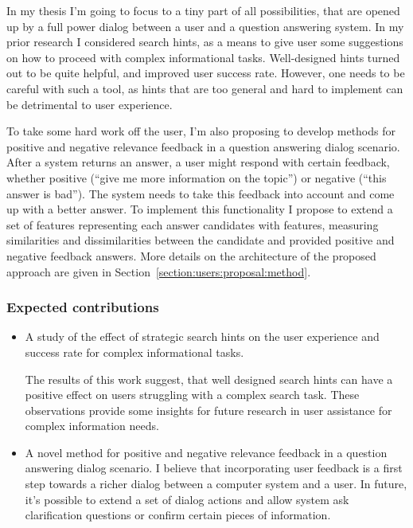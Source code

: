 In my thesis I'm going to focus to a tiny part of all possibilities, that are opened up by a full power dialog between a user and a question answering system.
In my prior research I considered search hints, as a means to give user some suggestions on how to proceed with complex informational tasks.
Well-designed hints turned out to be quite helpful, and improved user success rate.
However, one needs to be careful with such a tool, as hints that are too general and hard to implement can be detrimental to user experience.

To take some hard work off the user, I'm also proposing to develop methods for positive and negative relevance feedback in a question answering dialog scenario.
After a system returns an answer, a user might respond with certain feedback, whether positive (\eg ``give me more information on the topic'') or negative (\eg ``this answer is bad'').
The system needs to take this feedback into account and come up with a better answer.
To implement this functionality I propose to extend a set of features representing each answer candidates with features, measuring similarities and dissimilarities between the candidate and provided positive and negative feedback answers.
More details on the architecture of the proposed approach are given in Section~\ref{section:users:proposal:method}.

\subsubsection{Expected contributions}
\label{section:proposal:plan:users:contributions}

\begin{itemize}
\item A study of the effect of strategic search hints on the user experience and success rate for complex informational tasks.

The results of this work suggest, that well designed search hints can have a positive effect on users struggling with a complex search task.
These observations provide some insights for future research in user assistance for complex information needs.

\item A novel method for positive and negative relevance feedback in a question answering dialog scenario. 
I believe that incorporating user feedback is a first step towards a richer dialog between a computer system and a user.
In future, it's possible to extend a set of dialog actions and allow system ask clarification questions or confirm certain pieces of information.
\end{itemize}

